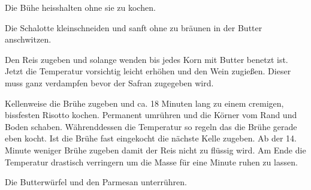 \vspace*{\fill}
\begin{multicols}{2}

Die Bühe heisshalten ohne sie zu kochen.

Die Schalotte kleinschneiden und sanft ohne zu bräunen 
in der Butter anschwitzen.\newline

Den Reis zugeben und solange wenden bis jedes Korn mit Butter
benetzt ist.
Jetzt die Temperatur vorsichtig leicht erhöhen und den Wein
zugießen. Dieser muss ganz verdampfen bevor der Safran zugegeben wird.\newline

Kellenweise die Brühe zugeben und ca. 18 Minuten lang zu einem
cremigen, bissfesten Risotto kochen.
Permanent umrühren und  die Körner vom Rand und Boden schaben.
Währenddessen die Temperatur so regeln das die Brühe gerade eben kocht.
Ist die Brühe fast eingekocht die nächste Kelle zugeben.\newline
Ab der 14. Minute weniger Brühe zugeben damit der Reis nicht zu
flüssig wird.\newline
Am Ende die Temperatur drastisch verringern um die Masse für eine
Minute ruhen zu lassen.\newline

Die Butterwürfel und den Parmesan unterrühren.



\end{multicols}
\vfill
